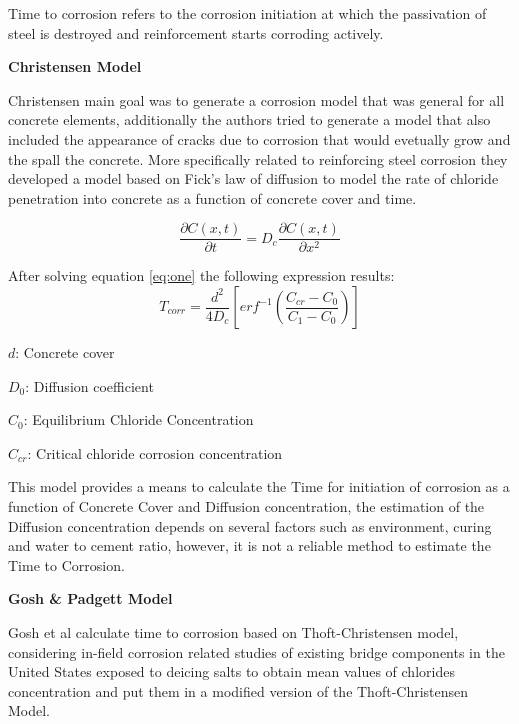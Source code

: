 Time to corrosion refers to the corrosion initiation at which the passivation of steel is destroyed and reinforcement starts corroding actively.
\newline

\textbf{Christensen Model}
\newline

Christensen \cite{Thoft-Christensen} main goal was to generate a corrosion model that was general for all concrete elements, additionally the authors tried to generate a model that also included the appearance of cracks due to corrosion that would evetually grow and the spall the concrete. More specifically related to reinforcing steel corrosion they developed a model based on Fick's law of diffusion to model the rate of chloride penetration into concrete as a function of concrete cover and time. 

\begin{equation}
	\frac{\partial C(x,t)}{\partial t} = D_c \frac{\partial C(x,t)}{\partial x^2}
	\label{eq:one}
\end{equation}

After solving equation \ref{eq:one} the following expression results:
\begin{equation}
  T_{corr}=\frac{d^2}{4D_c} \left[erf^{-1}\left(\frac{C_{cr}-C_{0}}{C_1 -C_0}\right)\right]
  \label{eq:two}
\end{equation} 

$d$: Concrete cover

$D_0$: Diffusion coefficient

$C_{0}$: Equilibrium Chloride Concentration

$C_{cr}$: Critical chloride corrosion concentration
\newline

This model provides a means to calculate the Time for initiation of corrosion as a function of Concrete Cover and Diffusion concentration, the estimation of the Diffusion concentration depends on several factors such as environment, curing and water to cement ratio, however, it is not a reliable method to estimate the Time to Corrosion.
\newline

\textbf{Gosh \& Padgett Model}
\newline

Gosh et al calculate time to corrosion based on Thoft-Christensen model, considering in-field corrosion related studies of existing bridge components in the United States exposed to deicing salts to obtain mean values of chlorides concentration and put them in a modified version of the Thoft-Christensen Model.

